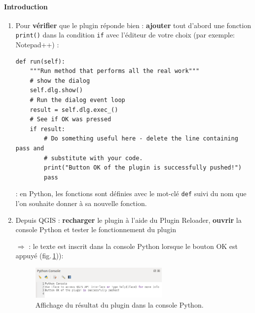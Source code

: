 \documentclass[11pt]{article}
\begin{document}
\paragraph*{Introduction}

\begin{enumerate}\itemsep0.4em
\item Pour \textbf{vérifier} que le plugin réponde bien : \textbf{ajouter} tout d'abord une fonction \og{}\texttt{print()}\fg{} dans la condition \og \texttt{if} \fg{} avec l'éditeur de votre choix (par exemple: Notepad++) :

\vspace*{-2em}
\begin{center}
\begin{minipage}[t]{0.98\textwidth}
\begin{verbatim}
def run(self):
    """Run method that performs all the real work"""
    # show the dialog
    self.dlg.show()
    # Run the dialog event loop
    result = self.dlg.exec_()
    # See if OK was pressed
    if result:
        # Do something useful here - delete the line containing pass and
        # substitute with your code.
        print("Button OK of the plugin is successfully pushed!")
        pass
\end{verbatim}
\end{minipage}
\end{center}
\vspace*{0.4em}

\underline{}: en Python, les fonctions sont définies avec le mot-clé \og \texttt{def} \fg{} suivi du nom que l'on souhaite donner à sa nouvelle fonction.

\vspace*{0.4em}
\item Depuis QGIS : \textbf{recharger} le plugin à l'aide du \og{}Plugin Reloader\fg{}, \textbf{ouvrir} la console Python et tester le fonctionnement du plugin





\newpage{}
$\Rightarrow$ \underline{}: le texte est inscrit dans la console Python lorsque le bouton \og OK \fg{} est appuyé (fig.\,\ref{resplug})):


\begin{figure}[H]
    \centering
    \includegraphics[width=0.64\textwidth]{plugin_first_result.png}
    \vspace*{-0.8em}
    \caption[Affichage du résultat du plugin dans la console Python.]{Affichage du résultat du plugin dans la console Python.}
    \label{resplug}
\end{figure}



\end{enumerate}
\end{document}
